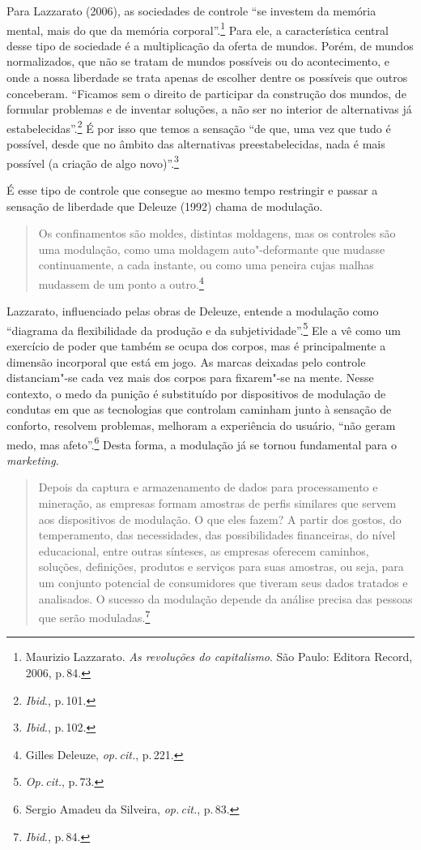 Para Lazzarato (2006), as sociedades de controle ``se investem da memória mental, mais do que
da memória corporal''.\footnote{Maurizio Lazzarato. \emph{As revoluções do capitalismo}. São Paulo: Editora
Record, 2006, p.\,84.} Para ele, a característica central desse
tipo de sociedade é a multiplicação da oferta de mundos. Porém, de
mundos normalizados, que não se tratam de mundos possíveis ou do
acontecimento, e onde a nossa liberdade se trata apenas de escolher
dentre os possíveis que outros conceberam. ``Ficamos sem o direito de
participar da construção dos mundos, de formular problemas e de inventar
soluções, a não ser no interior de alternativas já estabelecidas''.\footnote{\textit{Ibid}., p.\,101.}
É por isso que temos a sensação ``de que, uma vez que tudo é possível, desde que no âmbito das alternativas preestabelecidas, nada é mais
possível (a criação de algo novo)''.\footnote{\textit{Ibid}., p.\,102.}

É esse tipo de controle que consegue ao mesmo tempo restringir e passar
a sensação de liberdade que Deleuze (1992) chama de modulação.

\begin{quote}
Os confinamentos são moldes, distintas moldagens, mas os controles são
uma modulação, como uma moldagem auto"-deformante que mudasse
continuamente, a cada instante, ou como uma peneira cujas malhas
mudassem de um ponto a outro.\footnote{Gilles Deleuze, \textit{op.\,cit.}, p.\,221.}
\end{quote}

Lazzarato, influenciado pelas obras de Deleuze, entende a
modulação como ``diagrama da flexibilidade da produção e da
subjetividade''.\footnote{\textit{Op.\,cit.}, p.\,73.} Ele a vê como um exercício de poder que também se
ocupa dos corpos, mas é principalmente a dimensão incorporal que está em
jogo. As marcas deixadas pelo controle distanciam"-se cada vez mais dos
corpos para fixarem"-se na mente. Nesse contexto, o medo da punição é
substituído por dispositivos de modulação de condutas em que as
tecnologias que controlam caminham junto à sensação de conforto,
resolvem problemas, melhoram a experiência do usuário, ``não geram medo,
mas afeto''.\footnote{Sergio Amadeu da Silveira, \textit{op.\,cit.}, p.\,83.} Desta forma, a modulação já se tornou fundamental para o \emph{marketing}.

\begin{quote}
Depois da captura e armazenamento de dados para processamento e
mineração, as empresas formam amostras de perfis similares que servem
aos dispositivos de modulação. O que eles fazem? A partir dos gostos, do
temperamento, das necessidades, das possibilidades financeiras, do nível
educacional, entre outras sínteses, as empresas oferecem caminhos,
soluções, definições, produtos e serviços para suas amostras, ou seja,
para um conjunto potencial de consumidores que tiveram seus dados
tratados e analisados. O sucesso da modulação depende da análise precisa
das pessoas que serão moduladas.\footnote{\textit{Ibid}., p.\,84.}
\end{quote}

